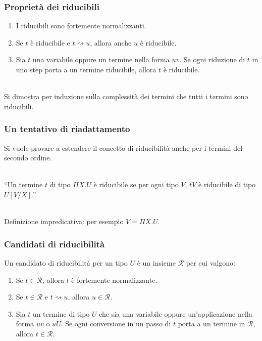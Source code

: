 \documentclass{beamer}
\newcommand{\conv}{\rightsquigarrow}
\newcommand{\can}{\mathcal}
\begin{document}
\begin{frame}
    \frametitle{Propriet\`a dei riducibili}
    \begin{enumerate}
        \item I riducibili sono fortemente normalizzanti.
        \item Se $t$ \`e riducibile e $t\conv u$, allora anche $u$ \`e
            riducibile.
        \item Sia $t$ una variabile oppure un termine nella forma $uv$. Se ogni
            riduzione di $t$ in uno step porta a un termine riducibile, allora
            $t$ \`e riducibile.
        \\~\
    \end{enumerate}
    Si dimostra per induzione sulla complessit\`a dei termini che tutti i
    termini sono riducibili.
\end{frame}


\begin{frame}
    \frametitle{Un tentativo di riadattamento}
    Si vuole provare a estendere il concetto di riducibilit\`a anche per i
    termini del secondo ordine.
    \\~\

    ``Un termine $t$ di tipo $\Pi X. U$ \`e riducibile se per ogni tipo $V$,
    $tV$ \`e riducibile di tipo $U[V/X]$.''
    \\~\

    Definizione impredicativa: per esempio $V = \Pi X. U$.
\end{frame}

\begin{frame}
    \frametitle{Candidati di riducibilit\`a}
    Un candidato di riducibilit\`a per un tipo $U$ \`e un insieme $\can{R}$ per
    cui valgono:
    \begin{enumerate}
        \item Se $t\in \can{R}$, allora $t$ \`e fortemente normalizzante.
        \item Se $t\in \can{R}$ e $t\conv u$, allora $u\in\can{R}$.
        \item Sia $t$ un termine di tipo $U$ che sia una variabile oppure
            un'applicazione nella forma $uv$ o $uU$. Se ogni conversione in un
            passo di $t$ porta a un termine in $\can{R}$, allora $t\in\can{R}$.
    \end{enumerate}
\end{frame}

\newcommand{\red}{\text{RED}}
\newcommand{\ronx}{[\underline{\can{R}}/\underline{X}]}
\end{document}

